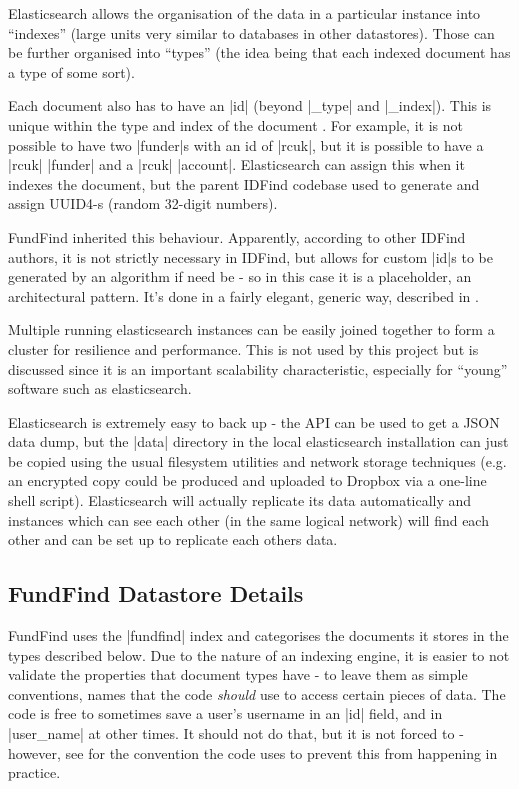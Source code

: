  Elasticsearch allows the organisation of the data in a particular instance into ``indexes'' (large units very similar to databases in other datastores). Those can be further organised into ``types'' (the idea being that each indexed document has a type of some sort).
 
 Each document also has to have an |id| (beyond |_type| and |_index|). This is unique within the type and index of the document \cite{es-uid-field}. For example, it is not possible to have two |funder|s with an id of |rcuk|, but it is possible to have a |rcuk| |funder| and a |rcuk| |account|.  Elasticsearch can assign this when it indexes the document, but the parent IDFind codebase used to generate and assign UUID4-s (random 32-digit numbers).
 
 FundFind inherited this behaviour. Apparently, according to other IDFind authors, it is not strictly necessary in IDFind, but allows for custom |id|s to be generated by an algorithm if need be - so in this case it is a placeholder, an architectural pattern. It's done in a fairly elegant, generic way, described in .
 
 Multiple running elasticsearch instances can be easily joined together to form a cluster for resilience and performance. This is not used by this project but is discussed since it is an important scalability characteristic, especially for ``young'' software such as elasticsearch.
 
 Elasticsearch is extremely easy to back up - the API can be used to get a JSON data dump, but the |data| directory in the local elasticsearch installation can just be copied using the usual filesystem utilities and network storage techniques (e.g. an encrypted copy could be produced and uploaded to Dropbox via a one-line shell script). Elasticsearch will actually replicate its data automatically and instances which can see each other (in the same logical network) will find each other and can be set up to replicate each others data.

\subsection{FundFind Datastore Details}
\label{datastore-details}
FundFind uses the |fundfind| index and categorises the documents it stores in the types described below. Due to the nature of an indexing engine, it is easier to not validate the properties that document types have - to leave them as simple conventions, names that the code \emph{should} use to access certain pieces of data. The code is free to sometimes save a user's username in an |id| field, and in |user_name| at other times. It should not do that, but it is not forced to - however, see  for the convention the code uses to prevent this from happening in practice.


